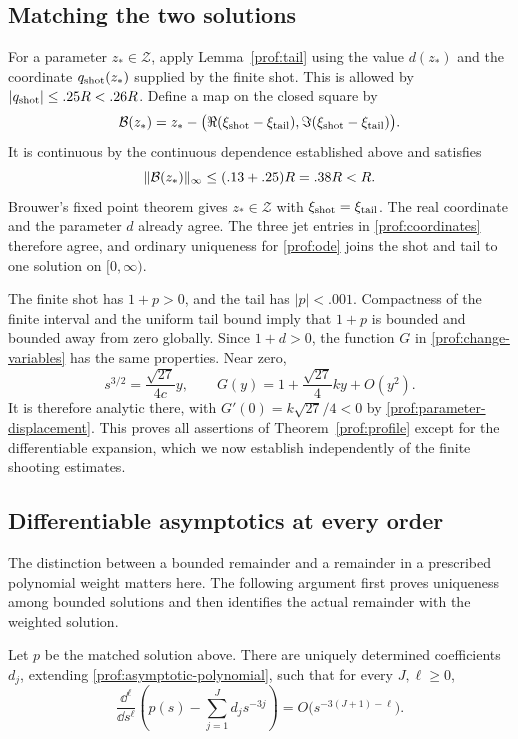 \subsection{Matching the two solutions}

For a parameter $z_*\in\mathcal Z$, apply Lemma~\ref{prof:tail} using
the value $d(z_*)$ and the coordinate $q_{\rm shot}(z_*)$ supplied by
the finite shot.  This is allowed by $|q_{\rm shot}|\le .25R<.26R$.
Define a map on the closed square by
\[
 \mathcal B(z_*)=z_*
 -\bigl(\Re(\xi_{\rm shot}-\xi_{\rm tail}),
        \Im(\xi_{\rm shot}-\xi_{\rm tail})\bigr).
\]
It is continuous by the continuous dependence established above and
satisfies
\[
 \lVert \mathcal B(z_*)\rVert_\infty\le(.13+.25)R=.38R<R.
\]
Brouwer's fixed point theorem gives $z_*\in\mathcal Z$ with
$\xi_{\rm shot}=\xi_{\rm tail}$.  The real coordinate and the parameter
$d$ already agree.  The three jet entries in \eqref{prof:coordinates}
therefore agree, and ordinary uniqueness for \eqref{prof:ode} joins
the shot and tail to one solution on $[0,\infty)$.

The finite shot has $1+p>0$, and the tail has $|p|<.001$.
Compactness of the finite interval and the uniform tail bound imply
that $1+p$ is bounded and bounded away from zero globally.  Since
$1+d>0$, the function $G$ in \eqref{prof:change-variables} has the same
properties.  Near zero,
\[
 s^{3/2}=\frac{\sqrt{27}}{4c}y,
 \qquad G(y)=1+\frac{\sqrt{27}}4ky+O(y^2).
\]
It is therefore analytic there, with
$G'(0)=k\sqrt{27}/4<0$ by \eqref{prof:parameter-displacement}.
This proves all assertions of Theorem~\ref{prof:profile} except for the
differentiable expansion, which we now establish independently of the
finite shooting estimates.

\subsection{Differentiable asymptotics at every order}

The distinction between a bounded remainder and a remainder in a prescribed
polynomial weight matters here.  The following argument first proves
uniqueness among bounded solutions and then identifies the actual
remainder with the weighted solution.

\begin{lemma}\label{prof:weighted-remainder}
Let $p$ be the matched solution above.  There are uniquely determined
coefficients $d_j$, extending \eqref{prof:asymptotic-polynomial}, such that
for every $J,\ell\ge0$,
\begin{equation}\label{prof:s-expansion}
 \frac{\dd^\ell}{\dd s^\ell}
 \left(p(s)-\sum_{j=1}^{J}d_js^{-3j}\right)
 =O\bigl(s^{-3(J+1)-\ell}\bigr).
\end{equation}
\end{lemma}

